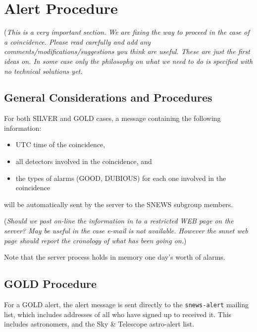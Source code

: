 \documentclass{article}
\begin{document}
\section{Alert Procedure}
({\it This is a very important section. We are fixing the way to proceed
in the case of a coincidence. Please read carefully and add any 
comments/modifications/suggestions you think are useful. These are 
just the first ideas on. In some case  only the philosophy on what we need 
to do is specified with no technical solutions yet.}\\

\subsection{General Considerations and Procedures}

For both SILVER and GOLD cases, a message containing the following
information:

\begin{itemize}
\item UTC time of the coincidence,
\item all detectors involved in the coincidence, and
\item the types of alarms (GOOD, DUBIOUS) for each one involved
in the coincidence
\end{itemize}

will be automatically sent by the server to the SNEWS subgroup
members. 

({\it Should we post on-line the information in to a 
restricted WEB page on the server? May be useful in the case e-mail is not available. 
However the snnet web page should report the cronology of what has been going on.})

 
Note that the server process holds in memory one day's worth of
alarms.  

\subsection{GOLD Procedure}\label{GOLD}

For a GOLD alert, the alert message is sent directly to the 
{\tt snews-alert} mailing list, which includes addresses of all
who have signed up to received it. This includes astronomers,
and the Sky \& Telescope astro-alert list. 
\end{document}
